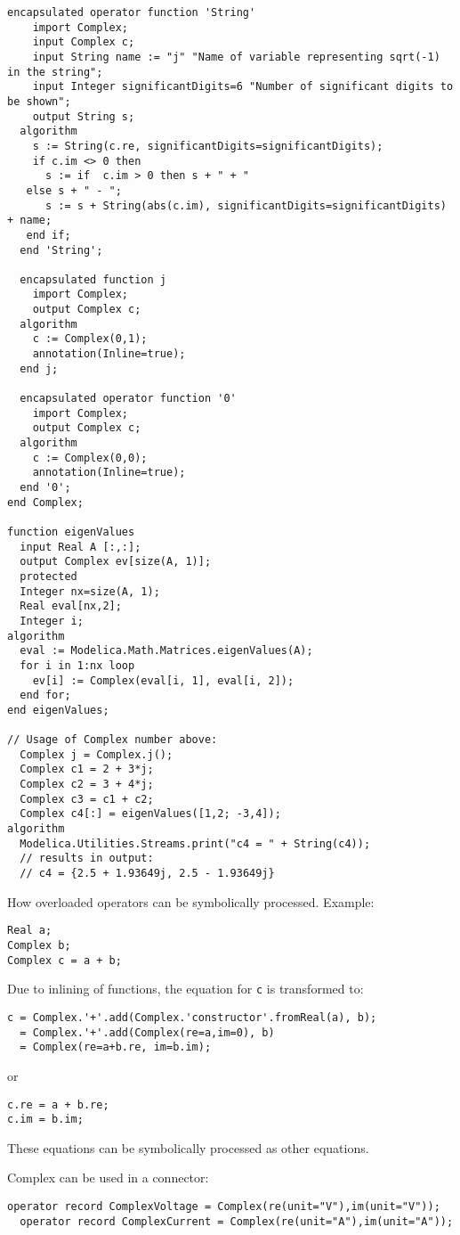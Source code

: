 \begin{example}
\begin{lstlisting}[language=modelica,escapechar=!]
  encapsulated operator function 'String'
    import Complex;
    input Complex c;
    input String name := "j" "Name of variable representing sqrt(-1) in the string";
    input Integer significantDigits=6 "Number of significant digits to be shown";
    output String s;
  algorithm
    s := String(c.re, significantDigits=significantDigits);
    if c.im <> 0 then
      s := if  c.im > 0 then s + " + "
   else s + " - ";
      s := s + String(abs(c.im), significantDigits=significantDigits) + name;
   end if;
  end 'String';

  encapsulated function j
    import Complex;
    output Complex c;
  algorithm
    c := Complex(0,1);
    annotation(Inline=true);
  end j;

  encapsulated operator function '0'
    import Complex;
    output Complex c;
  algorithm
    c := Complex(0,0);
    annotation(Inline=true);
  end '0';
end Complex;

function eigenValues
  input Real A [:,:];
  output Complex ev[size(A, 1)];
  protected
  Integer nx=size(A, 1);
  Real eval[nx,2];
  Integer i;
algorithm
  eval := Modelica.Math.Matrices.eigenValues(A);
  for i in 1:nx loop
    ev[i] := Complex(eval[i, 1], eval[i, 2]);
  end for;
end eigenValues;

// Usage of Complex number above:
  Complex j = Complex.j();
  Complex c1 = 2 + 3*j;
  Complex c2 = 3 + 4*j;
  Complex c3 = c1 + c2;
  Complex c4[:] = eigenValues([1,2; -3,4]);
algorithm
  Modelica.Utilities.Streams.print("c4 = " + String(c4));
  // results in output:
  // c4 = {2.5 + 1.93649j, 2.5 - 1.93649j}
\end{lstlisting}

How overloaded operators can be symbolically processed. Example:
\begin{lstlisting}[language=modelica]
Real a;
Complex b;
Complex c = a + b;
\end{lstlisting}
Due to inlining of functions, the equation for \lstinline!c! is
transformed to:
\begin{lstlisting}[language=modelica]
c = Complex.'+'.add(Complex.'constructor'.fromReal(a), b);
  = Complex.'+'.add(Complex(re=a,im=0), b)
  = Complex(re=a+b.re, im=b.im);
\end{lstlisting}
or
\begin{lstlisting}[language=modelica]
c.re = a + b.re;
c.im = b.im;
\end{lstlisting}
These equations can be symbolically processed as other equations.

Complex can be used in a connector:
\begin{lstlisting}[language=modelica]
  operator record ComplexVoltage = Complex(re(unit="V"),im(unit="V"));
  operator record ComplexCurrent = Complex(re(unit="A"),im(unit="A"));


\end{lstlisting}
\end{example}
